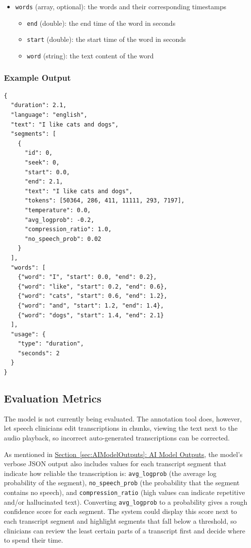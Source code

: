 \documentclass[12pt]{article}
\begin{document}
\begin{itemize}
\begin{itemize}
\begin{itemize}
        \end{itemize}
        \item \texttt{words} (array, optional): the words and their corresponding timestamps
        \begin{itemize}
            \item \texttt{end} (double): the end time of the word in seconds
            \item \texttt{start} (double): the start time of the word in seconds
            \item \texttt{word} (string): the text content of the word
        \end{itemize}
    \end{itemize}
\end{itemize}

\subsubsection{Example Output} \label{sec:ExampleOutput}
\begin{verbatim}
{
  "duration": 2.1,
  "language": "english",
  "text": "I like cats and dogs",
  "segments": [
    {
      "id": 0,
      "seek": 0,
      "start": 0.0,
      "end": 2.1,
      "text": "I like cats and dogs",
      "tokens": [50364, 286, 411, 11111, 293, 7197],
      "temperature": 0.0,
      "avg_logprob": -0.2,
      "compression_ratio": 1.0,
      "no_speech_prob": 0.02
    }
  ],
  "words": [
    {"word": "I", "start": 0.0, "end": 0.2},
    {"word": "like", "start": 0.2, "end": 0.6},
    {"word": "cats", "start": 0.6, "end": 1.2},
    {"word": "and", "start": 1.2, "end": 1.4},
    {"word": "dogs", "start": 1.4, "end": 2.1}
  ],
  "usage": {
    "type": "duration",
    "seconds": 2
  }
}
\end{verbatim}

\subsection{Evaluation Metrics}
The model is not currently being evaluated. The annotation tool does, however, let speech clinicians edit transcriptions in chunks, viewing the text next to the audio playback, so incorrect auto-generated transcriptions can be corrected.

As mentioned in {\hyperref[sec:AIModelOutputs]{Section~\ref*{sec:AIModelOutputs}: AI Model Outputs}}, the model's verbose JSON output also includes values for each transcript segment that indicate how reliable the transcription is: \texttt{avg\_logprob} (the average log probability of the segment), \texttt{no\_speech\_prob} (the probability that the segment contains no speech), and \texttt{compression\_ratio} (high values can indicate repetitive and/or hallucinated text). Converting \texttt{avg\_logprob} to a probability gives a rough confidence score for each segment. The system could display this score next to each transcript segment and highlight segments that fall below a threshold, so clinicians can review the least certain parts of a transcript first and decide where to spend their time.
\end{document}
